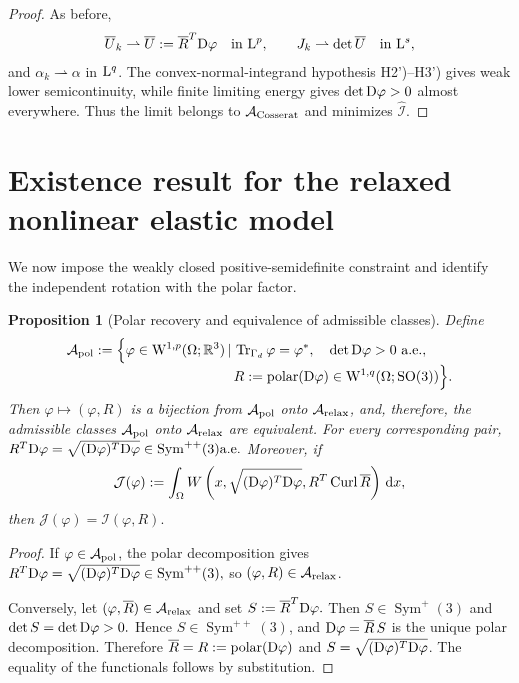 \documentclass[11pt]{article}
\newtheorem{proposition}[theorem]{Proposition}
\begin{document}
\begin{proof}
As before,
\begin{align}
\overline U_k\rightharpoonup \overline U:= \overline R ^T{\rm D}\varphi
\quad\text{in }{\rm L}^p,
\qquad
J_k\rightharpoonup\det \overline U
\quad\text{in }{\rm L}^s,
\end{align}
and $\alpha_k\rightharpoonup\alpha$ in ${\rm L}^q$. The convex-normal-integrand hypothesis H2')--H3') gives weak lower semicontinuity, while finite limiting energy gives $\det{\rm D}\varphi>0$ almost everywhere. Thus the limit belongs to $\mathcal A_{\rm Cosserat}$ and minimizes $\widehat{\mathcal I}$.
\end{proof}


\section{Existence result for the relaxed nonlinear elastic model}
\label{s4}\setcounter{equation}{0}


We now impose the weakly closed positive-semidefinite constraint and identify the independent rotation with the polar factor.

\begin{proposition}[Polar recovery and equivalence of admissible classes]
\label{prop:polar-equivalence}
Define
\begin{align}
\mathcal A_{\rm pol}
:=
\Bigl\{
\varphi\in {\rm W}^{1,p}(\Omega;\mathbb R^3)\,|\,
&\operatorname{Tr}_{\Gamma_d}\varphi=\varphi^*,
\quad
\det{\rm D}\varphi>0\ \text{a.e.},
\notag\\[-1mm]
& R:=\operatorname{polar}({\rm D}\varphi)
\in  {\rm W}^{1,q}(\Omega;{\rm SO}(3)) 
\Bigr\}.
\end{align}
Then
$
\varphi\mapsto(\varphi,R)
$
is a bijection from $\mathcal A_{\rm pol}$ onto $\mathcal A_{\rm relax}$, and, therefore, the admissible classes $\mathcal A_{\rm pol}$ onto $\mathcal A_{\rm relax}$ are equivalent. For every corresponding pair,
$
R^T{\rm D}\varphi
=
\sqrt{({\rm D}\varphi)^T{\rm D}\varphi}
\in\operatorname{Sym}^{++}(3)
\text{a.e.}
$
Moreover, if
\begin{align}
\mathcal J(\varphi)
:=
\int_\Omega
W\left(x,
\sqrt{({\rm D}\varphi)^T{\rm D}\varphi},
R^T\operatorname{Curl}\overline R
\right)\,\mathrm dx,
\end{align}
then
$
\mathcal J(\varphi)=\mathcal I(\varphi,R).
$
\end{proposition}

\begin{proof}
If $\varphi\in\mathcal A_{\rm pol}$, the polar decomposition gives
$
R^T{\rm D}\varphi
=
\sqrt{({\rm D}\varphi)^T{\rm D}\varphi}
\in\operatorname{Sym}^{++}(3),
$
so $(\varphi,R)\in\mathcal A_{\rm relax}$.

Conversely, let $(\varphi, \overline R )\in\mathcal A_{\rm relax}$ and set
$
S:= \overline R ^T{\rm D}\varphi.
$
Then $S\in\operatorname{Sym}^{+}(3)$ and
$
\det S=\det{\rm D}\varphi>0.
$
Hence $S\in\operatorname{Sym}^{++}(3)$, and
$
{\rm D}\varphi= \overline R\,  S
$
is the unique polar decomposition. Therefore $ \overline R =R:=\operatorname{polar}({\rm D}\varphi)$ and $S=\sqrt{({\rm D}\varphi)^T{\rm D}\varphi}$. The equality of the functionals follows by substitution.
\end{proof}
\end{document}
